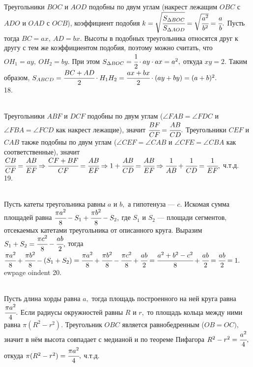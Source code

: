 Треугольники $BOC$ и $AOD$ подобны по двум углам (накрест лежащим $OBC$ с $ADO$ и $OAD$ с $OCB$), коэффициент подобия $k=\sqrt{\cfrac{S_{\Delta BOC}}{S_{\Delta AOD}}}=\sqrt{\cfrac{a^2}{b^2}}=\cfrac{a}{b}.$ Пусть тогда $BC=ax,\ AD=bx.$ Высоты в подобных треугольника относятся друг к другу с тем же коэффициентом подобия, поэтому можно считать, что $OH_1=ay,\ OH_2=by.$ При этом $S_{\Delta BOC}=\cfrac{1}{2}\cdot ay\cdot ax=a^2,$ откуда $xy=2.$ Таким образом, $S_{ABCD}=\cfrac{BC+AD}{2}\cdot H_1H_2=\cfrac{ax+bx}{2}\cdot(ay+by)=(a+b)^2.$\\
18. \begin{figure}[ht!]
\end{figure}\\
Треугольники $ABF$ и $DCF$ подобны по двум углам ($\angle FAB=\angle FDC$ и $\angle FBA=\angle FCD$ как накрест лежащие), значит $\cfrac{BF}{CF}=\cfrac{AB}{CD}.$ Треугольники $CEF$ и $CAB$ также подобны по двум углам ($\angle CEF=\angle CAB$ и $\angle CFE=\angle CBA$ как соответственные), значит $\cfrac{CB}{CF}=\cfrac{AB}{EF}\Rightarrow \cfrac{CF+BF}{CF}=\cfrac{AB}{EF}\Rightarrow 1+\cfrac{AB}{CD}=\cfrac{AB}{EF}
\Rightarrow \cfrac{1}{AB}+\cfrac{1}{CD}=\cfrac{1}{EF},$ ч.т.д.\\
19. \begin{figure}[ht!]
\end{figure}\\
Пусть катеты треугольника равны $a$ и $b,$ а гипотенуза --- $c.$ Искомая сумма площадей равна $\cfrac{\pi a^2}{8}-S_1+\cfrac{\pi b^2}{8}-S_2,$ где $S_1$ и $S_2$ --- площади сегментов, отсекаемых катетами треугольника от описанного круга. Выразим $S_1+S_2=\cfrac{\pi c^2}{8}-\cfrac{ab}{2},$ тогда
$\cfrac{\pi a^2}{8}+\cfrac{\pi b^2}{8}-(S_1+S_2)=\cfrac{\pi a^2}{8}+\cfrac{\pi b^2}{8}-\cfrac{\pi c^2}{8}+\cfrac{ab}{2}=\cfrac{a^2+b^2-c^2}{8}+\cfrac{ab}{2}=
\cfrac{ab}{2}=1.$
ewpage
oindent
20. \begin{figure}[ht!]
\end{figure}\\
Пусть длина хорды равна $a,$ тогда площадь построенного на ней круга равна $\cfrac{\pi a^2}{4}.$ Если радиусы окружностей равны $R$ и $r,$ то площадь кольца между ними равна $\pi(R^2-r^2).$ Треугольник $OBC$ является равнобедренным ($OB=OC),$ значит в нём высота совпадает с медианой и по теореме Пифагора $R^2-r^2=\cfrac{a^2}{4},$ откуда $\pi(R^2-r^2)=\cfrac{\pi a^2}{4},$ ч.т.д.\\
